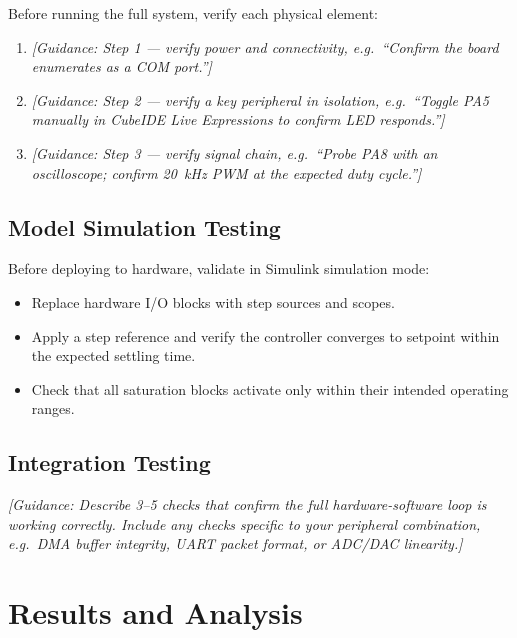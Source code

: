 Before running the full system, verify each physical element:

\begin{enumerate}
    \item \textit{[Guidance: Step 1 --- verify power and connectivity,
          e.g.\ ``Confirm the board enumerates as a COM port.'']}
    \item \textit{[Guidance: Step 2 --- verify a key peripheral in
          isolation, e.g.\ ``Toggle PA5 manually in CubeIDE Live
          Expressions to confirm LED responds.'']}
    \item \textit{[Guidance: Step 3 --- verify signal chain,
          e.g.\ ``Probe PA8 with an oscilloscope; confirm
          \SI{20}{kHz} PWM at the expected duty cycle.'']}
\end{enumerate}

\subsection{Model Simulation Testing}

Before deploying to hardware, validate in Simulink simulation mode:

\begin{itemize}
    \item Replace hardware I/O blocks with step sources and scopes.
    \item Apply a step reference and verify the controller converges
          to setpoint within the expected settling time.
    \item Check that all saturation blocks activate only within
          their intended operating ranges.
\end{itemize}

\subsection{Integration Testing}

\textit{[Guidance: Describe 3--5 checks that confirm the full
hardware-software loop is working correctly. Include any checks
specific to your peripheral combination, e.g.\ DMA buffer
integrity, UART packet format, or ADC/DAC linearity.]}

\section{Results and Analysis}

